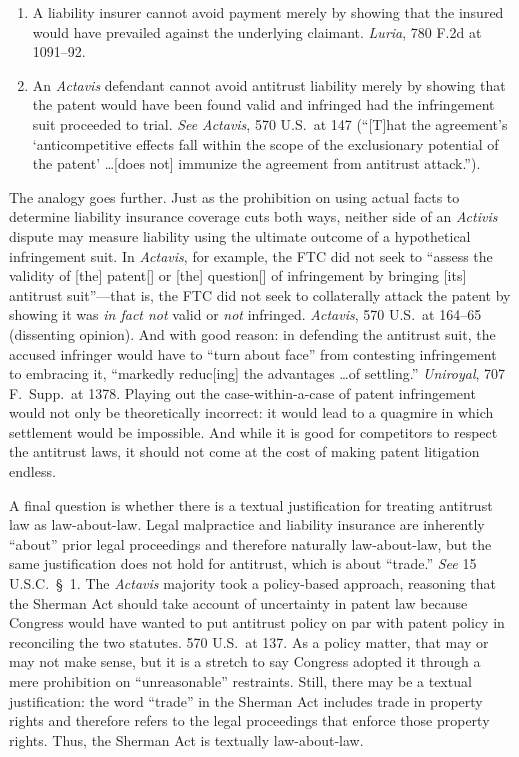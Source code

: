 \documentclass[
  12pt,
  letterpaper,
]{scrartcl}
\begin{document}
{\vspace{5pt}%
\begin{enumerate}
  \item A liability insurer cannot avoid payment merely by showing that the
    insured would have prevailed against the underlying claimant.
    \textit{Luria}, 780 F.2d at 1091--92.
  \item An \textit{Actavis} defendant cannot avoid antitrust liability merely
    by showing that the patent would have been found valid and infringed had the 
    infringement suit proceeded to trial. \textit{See}
    \textit{Actavis}, 570 U.S.~at 147 (``[T]hat the agreement's
    `anticompetitive effects fall within the scope of the exclusionary
    potential of the patent' \ldots [does not] immunize the agreement from
    antitrust attack.'').
\end{enumerate}%
}\vspace{-12pt}%

The analogy goes further. Just as the prohibition on using actual facts to determine liability insurance
coverage cuts both ways, neither side of an \textit{Activis} dispute may measure liability using the ultimate outcome of a hypothetical infringement suit. In \textit{Actavis}, for example, the FTC did not seek to ``assess the validity of [the]
patent[] or [the] question[] of infringement by bringing [its] antitrust
suit''---that is, the FTC did not seek to collaterally attack the patent by
showing it was \textit{in fact not} valid or \textit{not} infringed. \textit{Actavis},
570 U.S.~at 164--65 (dissenting opinion). And with good reason: in defending the antitrust suit, the accused
infringer would have to ``turn about face'' from contesting infringement to
embracing it, ``markedly reduc[ing] the advantages \ldots of settling.''
\textit{Uniroyal}, 707 F.~Supp.~at 1378. Playing out the case-within-a-case of patent infringement would not
only be theoretically incorrect: it would lead to a quagmire in which
settlement would be impossible. And while it is good for competitors to respect the antitrust laws, it should not come at the cost of making patent litigation endless.

A final question is whether there is a textual justification for treating
antitrust law as law-about-law. Legal malpractice and liability insurance are
inherently ``about'' prior legal proceedings and therefore naturally law-about-law, but the
same justification does not hold for antitrust, which is about ``trade.''
\textit{See} 15 U.S.C.~§~1. The \textit{Actavis} majority took a policy-based
approach, reasoning that the Sherman Act should take account of uncertainty in
patent law because Congress would have wanted to put antitrust policy on par
with patent policy in reconciling the two statutes. 570 U.S.~at 137. As a policy matter, that may or may not make sense, but it is a stretch to say Congress adopted it through a mere prohibition on ``unreasonable'' restraints. Still, there may be a textual justification: the word ``trade'' in the Sherman
Act includes trade in property rights and therefore refers to the legal
proceedings that enforce those property rights. Thus, the Sherman Act is
textually law-about-law.
\end{document}

